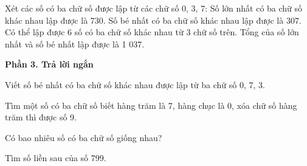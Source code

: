 \begin{ex} %
Xét các số có ba chữ số được lập từ các chữ số 0, 3, 7:
\choiceTF
{\True Số lớn nhất có ba chữ số khác nhau lập được là 730.}
{\True Số bé nhất có ba chữ số khác nhau lập được là 307.}
{Có thể lập được 6 số có ba chữ số khác nhau từ 3 chữ số trên.}
{\True Tổng của số lớn nhất và số bé nhất lập được là 1 037.}
\end{ex}

\textbf{Phần 3. Trả lời ngắn}

\begin{ex} %
Viết số bé nhất có ba chữ số khác nhau được lập từ ba chữ số 0, 7, 3.
\end{ex}

\begin{ex} %
Tìm một số có ba chữ số biết hàng trăm là 7, hàng chục là 0, xóa chữ số hàng trăm thì được số 9.
\end{ex}

\begin{ex} %
Có bao nhiêu số có ba chữ số giống nhau?
\end{ex}

\begin{ex} %
Tìm số liền sau của số 799.
\end{ex}

